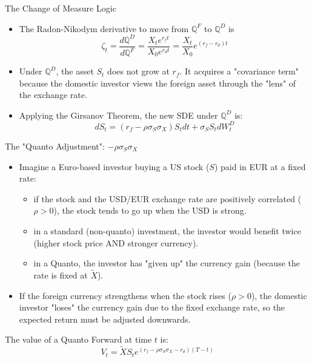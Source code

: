 \documentclass{beamer}
\begin{document}
\begin{frame}{The Change of Measure Logic}
	\begin{itemize}
		\item The Radon-Nikodym derivative to move from $\mathbb{Q}^F$ to $\mathbb{Q}^D$ is %
		\begin{equation}
			\zeta_t = \frac{d\mathbb{Q}^D}{d\mathbb{Q}^F} = \frac{X_t e^{r_f t}}{X_0 e^{r_d t}} = \frac{X_t}{X_0} e^{(r_f - r_d)t}
		\end{equation}
		\item Under $\mathbb{Q}^D$, the asset $S_t$ does not grow at $r_f$. It acquires a "covariance term" because the domestic investor views the foreign asset through the "lens" of the exchange rate.
		\item Applying the Girsanov Theorem, the new SDE under $\mathbb{Q}^D$ is:
		\begin{equation}
			dS_t=(r_f-\rho\sigma_S\sigma_X)S_t dt + \sigma_S S_t dW_t^D
		\end{equation}
	\end{itemize}
\end{frame}

\begin{frame}{The "Quanto Adjustment": $-\rho\sigma_S\sigma_X$}
	\begin{itemize}
		\item Imagine a Euro-based investor buying a US stock ($S$) paid in EUR at a fixed rate:
		\begin{itemize}
			\item if the stock and the USD/EUR exchange rate are positively correlated ($\rho>0$), the stock tends to go up when the USD is strong.
			\item in a standard (non-quanto) investment, the investor would benefit twice (higher stock price AND stronger currency).
			\item in a Quanto, the investor has "given up" the currency gain (because the rate is fixed at $\tilde{X}$).
		\end{itemize}
		\item If the foreign currency strengthens when the stock rises ($\rho > 0$), the domestic investor "loses" the currency gain due to the fixed exchange rate, so the expected return must be adjusted downwards.
	\end{itemize}
	The value of a Quanto Forward at time $t$ is:
	\begin{equation}
		\boxed{V_t=\tilde{X}S_t e^{(r_f-\rho\sigma_S\sigma_X-r_d)(T-t)}}
	\end{equation}
\end{frame}
\end{document}
